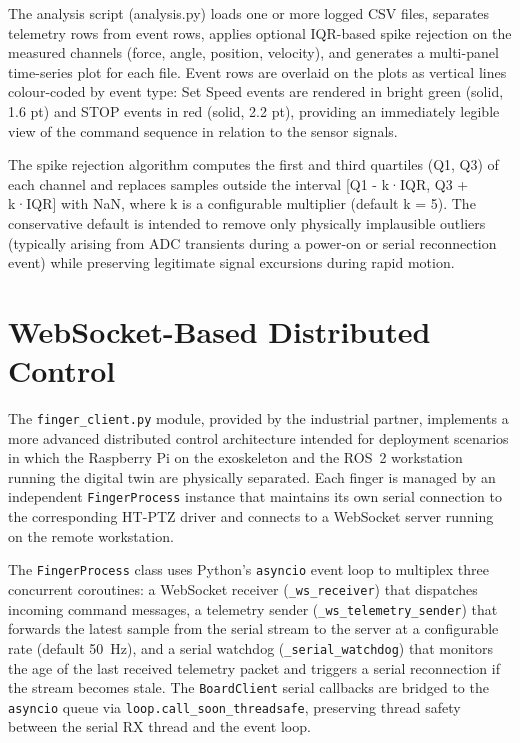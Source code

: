 The analysis script (analysis.py) loads one or more logged CSV files, separates telemetry rows from event rows, applies optional IQR-based spike rejection on the measured channels (force, angle, position, velocity), and generates a multi-panel time-series plot for each file. Event rows are overlaid on the plots as vertical lines colour-coded by event type: Set Speed events are rendered in bright green (solid, 1.6 pt) and STOP events in red (solid, 2.2 pt), providing an immediately legible view of the command sequence in relation to the sensor signals.

The spike rejection algorithm computes the first and third quartiles (Q1, Q3) of each channel and replaces samples outside the interval [Q1 - k·IQR, Q3 + k·IQR] with NaN, where k is a configurable multiplier (default k = 5). The conservative default is intended to remove only physically implausible outliers (typically arising from ADC transients during a power-on or serial reconnection event) while preserving legitimate signal excursions during rapid motion.

\section{WebSocket-Based Distributed Control}

The \texttt{finger\_client.py} module, provided by the industrial partner, implements a more advanced distributed control architecture intended for deployment scenarios in which the Raspberry Pi on the exoskeleton and the ROS~2 workstation running the digital twin are physically separated. Each finger is managed by an independent \texttt{FingerProcess} instance that maintains its own serial connection to the corresponding HT-PTZ driver and connects to a WebSocket server running on the remote workstation.

The \texttt{FingerProcess} class uses Python's \texttt{asyncio} event loop to multiplex three concurrent coroutines: a WebSocket receiver (\texttt{\_ws\_receiver}) that dispatches incoming command messages, a telemetry sender (\texttt{\_ws\_telemetry\_sender}) that forwards the latest sample from the serial stream to the server at a configurable rate (default 50~Hz), and a serial watchdog (\texttt{\_serial\_watchdog}) that monitors the age of the last received telemetry packet and triggers a serial reconnection if the stream becomes stale. The \texttt{BoardClient} serial callbacks are bridged to the \texttt{asyncio} queue via \texttt{loop.call\_soon\_threadsafe}, preserving thread safety between the serial RX thread and the event loop.

